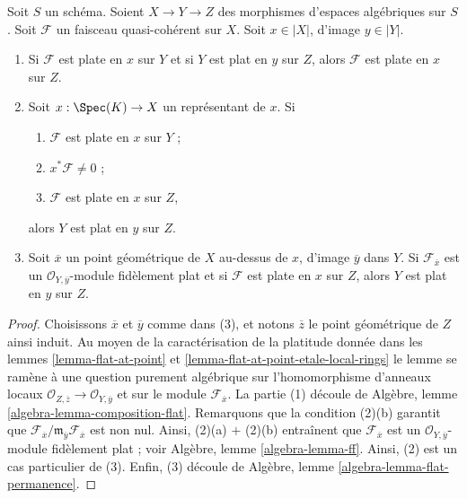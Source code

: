 \begin{lemma}
\label{lemma-composition-module-flat}
Soit $S$ un schéma. Soient $X \to Y \to Z$ des morphismes d'espaces algébriques
sur $S$. Soit $\mathcal{F}$ un faisceau quasi-cohérent sur $X$.
Soit $x \in |X|$, d'image $y \in |Y|$.
\begin{enumerate}
\item Si $\mathcal{F}$ est plate en $x$ sur $Y$ et si
$Y$ est plat en $y$ sur $Z$, alors $\mathcal{F}$ est plate en
$x$ sur $Z$.
\item Soit $x : \Spec(K) \to X$ un représentant de $x$. Si
\begin{enumerate}
\item $\mathcal{F}$ est plate en $x$ sur $Y$ ;
\item $x^*\mathcal{F} \not = 0$ ;
\item $\mathcal{F}$ est plate en $x$ sur $Z$,
\end{enumerate}
alors $Y$ est plat en $y$ sur $Z$.
\item Soit $\overline{x}$ un point géométrique de $X$ au-dessus de $x$,
d'image $\overline{y}$ dans $Y$. Si $\mathcal{F}_{\overline{x}}$ est un
$\mathcal{O}_{Y, \overline{y}}$-module fidèlement plat et si
$\mathcal{F}$ est plate en $x$ sur $Z$, alors
$Y$ est plat en $y$ sur $Z$.
\end{enumerate}
\end{lemma}

\begin{proof}
Choisissons $\overline{x}$ et $\overline{y}$ comme dans (3), et notons
$\overline{z}$ le point géométrique de $Z$ ainsi induit. Au moyen de la
caractérisation de la platitude donnée dans les
lemmes \ref{lemma-flat-at-point} et
\ref{lemma-flat-at-point-etale-local-rings}
le lemme se ramène à une question purement algébrique sur l'homomorphisme
d'anneaux locaux $\mathcal{O}_{Z, \overline{z}} \to \mathcal{O}_{Y, \overline{y}}$
et sur le module $\mathcal{F}_{\overline{x}}$.
La partie (1) découle de
Algèbre, lemme \ref{algebra-lemma-composition-flat}.
Remarquons que la condition (2)(b) garantit que
$\mathcal{F}_{\overline{x}}/
\mathfrak m_{\overline{y}} \mathcal{F}_{\overline{x}}$
est non nul. Ainsi, (2)(a) $+$ (2)(b) entraînent que $\mathcal{F}_{\overline{x}}$
est un $\mathcal{O}_{Y, \overline{y}}$-module fidèlement plat ; voir
Algèbre, lemme \ref{algebra-lemma-ff}.
Ainsi, (2) est un cas particulier de (3).
Enfin, (3) découle de
Algèbre, lemme \ref{algebra-lemma-flat-permanence}.
\end{proof}

